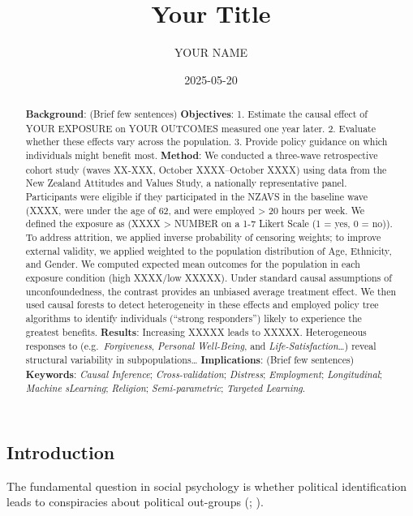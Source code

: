 \documentclass[
  single column]{article}
\title{Your Title}
\author{YOUR NAME}
\date{2025-05-20}
\begin{document}
\maketitle
\begin{abstract}
\textbf{Background}: (Brief few sentences) \textbf{Objectives}: 1.
Estimate the causal effect of YOUR EXPOSURE on YOUR OUTCOMES measured
one year later. 2. Evaluate whether these effects vary across the
population. 3. Provide policy guidance on which individuals might
benefit most. \textbf{Method}: We conducted a three-wave retrospective
cohort study (waves XX-XXX, October XXXX--October XXXX) using data from
the New Zealand Attitudes and Values Study, a nationally representative
panel. Participants were eligible if they participated in the NZAVS in
the baseline wave (XXXX, were under the age of 62, and were employed
\textgreater{} 20 hours per week. We defined the exposure as (XXXX
\textgreater{} NUMBER on a 1-7 Likert Scale (1 = yes, 0 = no)). To
address attrition, we applied inverse probability of censoring weights;
to improve external validity, we applied weighted to the population
distribution of Age, Ethnicity, and Gender. We computed expected mean
outcomes for the population in each exposure condition (high XXXX/low
XXXXX). Under standard causal assumptions of unconfoundedness, the
contrast provides an unbiased average treatment effect. We then used
causal forests to detect heterogeneity in these effects and employed
policy tree algorithms to identify individuals (``strong responders'')
likely to experience the greatest benefits. \textbf{Results}: Increasing
XXXXX leads to XXXXX. Heterogeneous responses to
(e.g.~\emph{Forgiveness}, \emph{Personal Well-Being}, and
\emph{Life-Satisfaction}\ldots) reveal structural variability in
subpopulations\ldots{} \textbf{Implications}: (Brief few sentences)
\textbf{Keywords}: \emph{Causal Inference}; \emph{Cross-validation};
\emph{Distress}; \emph{Employment}; \emph{Longitudinal}; \emph{Machine
sLearning}; \emph{Religion}; \emph{Semi-parametric}; \emph{Targeted
Learning}.
\end{abstract}


\newpage{}

\subsection{Introduction}\label{introduction}

The fundamental question in social psychology is whether political
identification leads to conspiracies about political out-groups
(;
).
\end{document}
